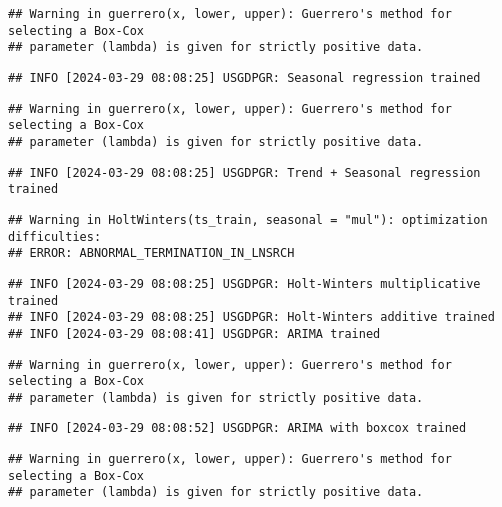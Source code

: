 \documentclass[
]{article}
\begin{document}
\begin{verbatim}
## Warning in guerrero(x, lower, upper): Guerrero's method for selecting a Box-Cox
## parameter (lambda) is given for strictly positive data.
\end{verbatim}

\begin{verbatim}
## INFO [2024-03-29 08:08:25] USGDPGR: Seasonal regression trained
\end{verbatim}

\begin{verbatim}
## Warning in guerrero(x, lower, upper): Guerrero's method for selecting a Box-Cox
## parameter (lambda) is given for strictly positive data.
\end{verbatim}

\begin{verbatim}
## INFO [2024-03-29 08:08:25] USGDPGR: Trend + Seasonal regression trained
\end{verbatim}

\begin{verbatim}
## Warning in HoltWinters(ts_train, seasonal = "mul"): optimization difficulties:
## ERROR: ABNORMAL_TERMINATION_IN_LNSRCH
\end{verbatim}

\begin{verbatim}
## INFO [2024-03-29 08:08:25] USGDPGR: Holt-Winters multiplicative trained
## INFO [2024-03-29 08:08:25] USGDPGR: Holt-Winters additive trained
## INFO [2024-03-29 08:08:41] USGDPGR: ARIMA trained
\end{verbatim}

\begin{verbatim}
## Warning in guerrero(x, lower, upper): Guerrero's method for selecting a Box-Cox
## parameter (lambda) is given for strictly positive data.
\end{verbatim}

\begin{verbatim}
## INFO [2024-03-29 08:08:52] USGDPGR: ARIMA with boxcox trained
\end{verbatim}

\begin{verbatim}
## Warning in guerrero(x, lower, upper): Guerrero's method for selecting a Box-Cox
## parameter (lambda) is given for strictly positive data.
\end{verbatim}
\end{document}
